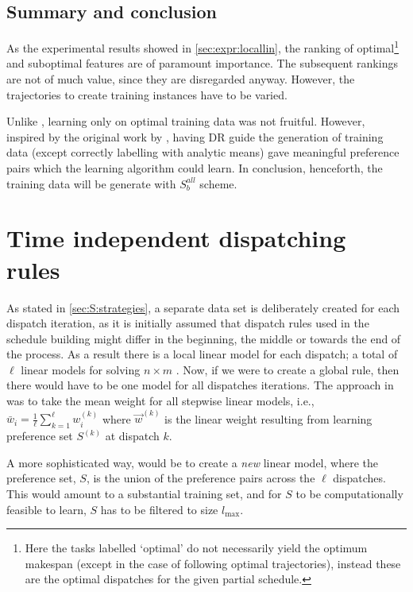 \subsection{Summary and conclusion }
As the experimental results showed in \cref{sec:expr:locallin}, the ranking of optimal\footnote{Here the tasks labelled `optimal' do not necessarily yield the optimum makespan (except in the case of following optimal trajectories), instead these are the optimal dispatches for the given partial schedule.} and suboptimal features are of paramount importance. The subsequent rankings are not of much value, since they are disregarded anyway. However, the trajectories to create training instances have to be varied.

Unlike \citep{Siggi10,Malik08,Russell09}, learning only on optimal training data was not fruitful. However, inspired by the original work by \cite{Siggi05}, having DR guide the generation of training data (except correctly labelling with analytic means) gave meaningful preference pairs which the learning algorithm could learn. In conclusion, henceforth, the training data will be generate with $S_{b}^{all}$ scheme.


\section{Time independent dispatching rules}\label{sec:pref:scalability}
As stated in \cref{sec:S:strategies}, a separate data set is deliberately created for each dispatch iteration, as it is initially assumed that dispatch rules used in the schedule building might differ in the beginning, the middle or towards the end of the process. As a result there is a local linear model for each dispatch; a total of $\ell$ linear models for solving $n\times m$ \jsp. Now, if we were to create a global rule, then there would have to be one model for all dispatches iterations. The approach in \cite{InRu11a} was to take the mean weight for all stepwise linear models, i.e., $\bar{w}_i=\frac{1}{\ell}\sum_{k=1}^{\ell}w_i^{(k)}$ where $\vec{w}^{(k)}$ is the linear weight resulting from learning preference set $S^{(k)}$ at dispatch $k$. 

A more sophisticated way, would be to create a \emph{new} linear model, where the preference set, $S$, is the union of the preference pairs across the $\ell$ dispatches. This would amount to a substantial training set, and for $S$ to be computationally feasible to learn, $S$ has to be filtered to size $l_{\max}$.

